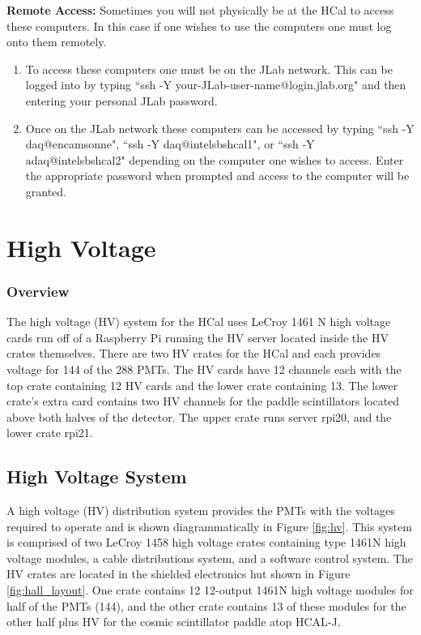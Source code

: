 \documentclass[oneside]{book}   %
\newcommand{\hcal}{HCAL-J\xspace}
\begin{document}
\textbf{\large{Remote Access:}}
Sometimes you will not physically be at the HCal to access these computers. In this case if one wishes to use the computers one must log onto them remotely.

\begin{enumerate}
	\item To access these computers one must be on the JLab network. This can be logged into by typing ``ssh -Y your-JLab-user-name@login.jlab.org" and then entering your personal JLab password. 
	\item Once on the JLab network these computers can be accessed by typing ``ssh -Y daq@encamsonne", ``ssh -Y  daq@intelsbshcal1", or ``ssh -Y  adaq@intelsbshcal2" depending on the computer one wishes to access. Enter the appropriate password when prompted and access to the computer will be granted.
\end{enumerate}

\chapter{High Voltage}
\label{hv}

\subsection{Overview}
\label{ssec:hv_overview}

The high voltage (HV) system for the HCal uses LeCroy 1461 N high voltage cards run off of a Raspberry Pi running the HV server located inside the HV crates themselves. There are two HV crates for the HCal and each provides voltage for 144 of the 288 PMTs. The HV cards have 12 channels each with the top crate containing 12 HV cards and the lower crate containing 13. The lower crate's extra card contains two HV channels for the paddle scintillators located above both halves of the detector. The upper crate runs server rpi20, and the lower crate rpi21. 

\section{High Voltage System}
\label{hv_layout}

A high voltage (HV) distribution system provides the PMTs with the voltages required to operate and is shown diagrammatically in Figure \ref{fig:hv}. This system is comprised of two LeCroy 1458 high voltage crates containing type 1461N high voltage modules, a cable distributions system, and a software control system. The HV crates are located in the shielded electronics hut shown in Figure \ref{fig:hall_layout}. One crate contains 12 12-output 1461N high voltage modules for half of the PMTs (144), and the other crate contains 13 of these modules for the other half plus HV for the cosmic scintillator paddle atop \hcal. \\
\end{document}
